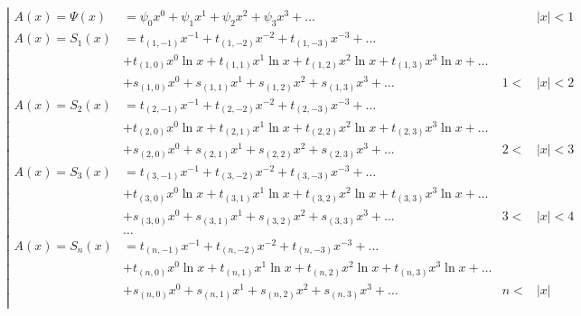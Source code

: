 \begin{equation*} \left| \begin{aligned}
A(x) = \Psi(x) &=
  \psi_0 x^0
+ \psi_1 x^1
+ \psi_2 x^2
+ \psi_3 x^3
+ \ldots &
&|x| < 1 \\
%
A(x) = S_1(x) &= 
  t_{(1,-1)} x^{-1}
+ t_{(1,-2)} x^{-2}
+ t_{(1,-3)} x^{-3}
+ \ldots \\ &
+ t_{(1,0)} x^0 \ln{x}
+ t_{(1,1)} x^1 \ln{x}
+ t_{(1,2)} x^2 \ln{x}
+ t_{(1,3)} x^3 \ln{x}
+ \ldots \\ &
+ s_{(1,0)} x^0
+ s_{(1,1)} x^1
+ s_{(1,2)} x^2
+ s_{(1,3)} x^3
+ \ldots &
1 < &|x| < 2 \\
%
A(x) = S_2(x) &= 
  t_{(2,-1)} x^{-1}
+ t_{(2,-2)} x^{-2}
+ t_{(2,-3)} x^{-3}
+ \ldots \\ &
+ t_{(2,0)} x^0 \ln{x}
+ t_{(2,1)} x^1 \ln{x}
+ t_{(2,2)} x^2 \ln{x}
+ t_{(2,3)} x^3 \ln{x}
+ \ldots \\ &
+ s_{(2,0)} x^0
+ s_{(2,1)} x^1
+ s_{(2,2)} x^2
+ s_{(2,3)} x^3
+ \ldots &
2 < &|x| < 3 \\
%
A(x) = S_3(x) &= 
  t_{(3,-1)} x^{-1}
+ t_{(3,-2)} x^{-2}
+ t_{(3,-3)} x^{-3}
+ \ldots \\ &
+ t_{(3,0)} x^0 \ln{x}
+ t_{(3,1)} x^1 \ln{x}
+ t_{(3,2)} x^2 \ln{x}
+ t_{(3,3)} x^3 \ln{x}
+ \ldots \\ &
+ s_{(3,0)} x^0
+ s_{(3,1)} x^1
+ s_{(3,2)} x^2
+ s_{(3,3)} x^3
+ \ldots &
3 < &|x| < 4 \\
%
&\ldots \\
%
A(x) = S_n(x) &= 
  t_{(n,-1)} x^{-1}
+ t_{(n,-2)} x^{-2}
+ t_{(n,-3)} x^{-3}
+ \ldots \\ &
+ t_{(n,0)} x^0 \ln{x}
+ t_{(n,1)} x^1 \ln{x}
+ t_{(n,2)} x^2 \ln{x}
+ t_{(n,3)} x^3 \ln{x}
+ \ldots \\ &
+ s_{(n,0)} x^0
+ s_{(n,1)} x^1
+ s_{(n,2)} x^2
+ s_{(n,3)} x^3
+ \ldots &
n < &|x| \\
\end{aligned} \right. \end{equation*}

